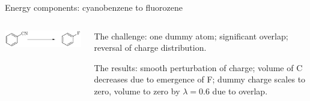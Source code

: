 \documentclass[10pt]{beamer}
\begin{document}

\begin{frame}{Energy components: cyanobenzene to fluorozene}

    \begin{columns}

        \begin{column}{0.65\textwidth}

\begin{center}
\hspace*{1cm}\includegraphics[scale=0.7]{figures/cnfrxn.pdf}\\
\scalebox{.5}{}\hspace*{-1cm}\scalebox{.5}{}\\
\scalebox{.5}{}\hspace*{-1cm}\scalebox{.5}{}
\end{center} 

        \end{column}
        
        \begin{column}{0.3\textwidth}  
        
The challenge: one dummy atom; significant overlap; reversal of charge distribution.

\bigskip

The results: smooth perturbation of charge; volume of C decreases due to emergence of F; dummy charge scales to zero, volume to zero by $\lambda = 0.6$ due to overlap.


        \end{column}

    \end{columns}

\end{frame}

\end{document}
